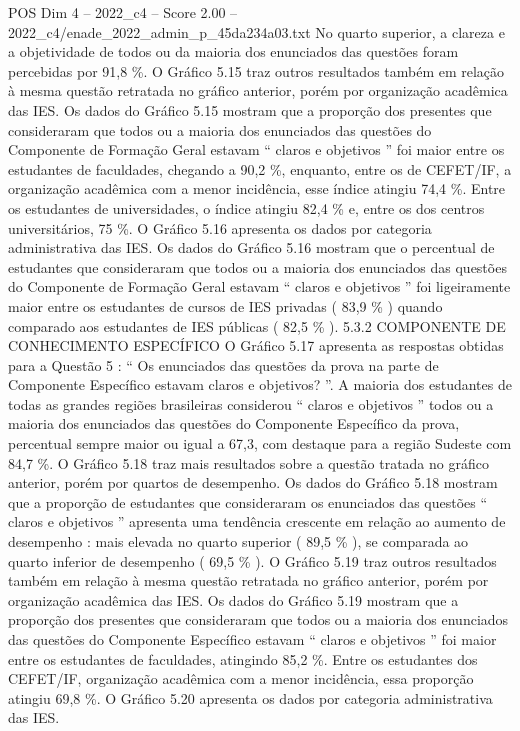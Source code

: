 \begin{textsample}{POS Dim 4 – 2022\_c4 – Score 2.00 – 2022\_c4/enade\_2022\_admin\_p\_45da234a03.txt}
No quarto superior, a clareza e a objetividade de todos ou da maioria dos enunciados das questões foram percebidas por 91,8 \%.
O Gráfico 5.15 traz outros resultados também em relação à mesma questão retratada no gráfico anterior, porém por organização acadêmica das IES.
Os dados do Gráfico 5.15 mostram que a proporção dos presentes que consideraram que todos ou a maioria dos enunciados das questões do Componente de Formação Geral estavam “ claros e objetivos ” foi maior entre os estudantes de faculdades, chegando a 90,2 \%, enquanto, entre os de CEFET/IF, a organização acadêmica com a menor incidência, esse índice atingiu 74,4 \%.
Entre os estudantes de universidades, o índice atingiu 82,4 \% e, entre os dos centros universitários, 75 \%.
O Gráfico 5.16 apresenta os dados por categoria administrativa das IES.
Os dados do Gráfico 5.16 mostram que o percentual de estudantes que consideraram que todos ou a maioria dos enunciados das questões do Componente de Formação Geral estavam “ claros e objetivos ” foi ligeiramente maior entre os estudantes de cursos de IES privadas ( 83,9 \% ) quando comparado aos estudantes de IES públicas ( 82,5 \% ). 5.3.2 COMPONENTE DE CONHECIMENTO ESPECÍFICO O Gráfico 5.17 apresenta as respostas obtidas para a Questão 5 : “ Os enunciados das questões da prova na parte de Componente Específico estavam claros e objetivos? ”.
A maioria dos estudantes de todas as grandes regiões brasileiras considerou “ claros e objetivos ” todos ou a maioria dos enunciados das questões do Componente Específico da prova, percentual sempre maior ou igual a 67,3, com destaque para a região Sudeste com 84,7 \%.
O Gráfico 5.18 traz mais resultados sobre a questão tratada no gráfico anterior, porém por quartos de desempenho.
Os dados do Gráfico 5.18 mostram que a proporção de estudantes que consideraram os enunciados das questões “ claros e objetivos ” apresenta uma tendência crescente em relação ao aumento de desempenho : mais elevada no quarto superior ( 89,5 \% ), se comparada ao quarto inferior de desempenho ( 69,5 \% ).
O Gráfico 5.19 traz outros resultados também em relação à mesma questão retratada no gráfico anterior, porém por organização acadêmica das IES.
Os dados do Gráfico 5.19 mostram que a proporção dos presentes que consideraram que todos ou a maioria dos enunciados das questões do Componente Específico estavam “ claros e objetivos ” foi maior entre os estudantes de faculdades, atingindo 85,2 \%.
Entre os estudantes dos CEFET/IF, organização acadêmica com a menor incidência, essa proporção atingiu 69,8 \%.
O Gráfico 5.20 apresenta os dados por categoria administrativa das IES.

\end{textsample}
